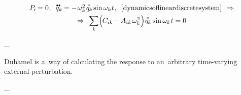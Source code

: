 \nopagebreak\vspace{-0.1em}\begin{equation}
\begin{array}{c}
P_{\hspace{-0.1ex}i} \hspace{-0.15ex} = 0
\hspace{.1ex} ,
\:\;
\mathdotdotabove{q}_k \hspace{-0.12ex} = - \hspace{.2ex} \omega_k^2 \hspace{.25ex} \mathasteriskabove{q}_{\hspace{-0.1ex}k} \hspace{-0.1ex} \operatorname{sin} \omega_k \hspace{.1ex} t
\hspace{.1ex} ,
\:\;
\eqref{dynamicsoflineardiscretesystem}
\:\: \Rightarrow
\\[.3em]
%
\Rightarrow \:\,
\scalebox{0.95}[1]{$\displaystyle \sum_{\smash{k}}$} \Bigl( \hspace{-0.2ex} C_{ik} \hspace{-0.1ex} - \hspace{-0.2ex} A_{ik} \hspace{.25ex} \omega_k^2 \hspace{.1ex} \Bigr) \hspace{.12ex}
\mathasteriskabove{q}_{\hspace{-0.1ex}k} \operatorname{sin} \omega_k \hspace{.1ex} t
= 0
\end{array}
\end{equation}

...


 Duhamel
is a~way of calculating the response
to an~arbitrary
time-varying
external
perturbation.

...

\section*{\small \wordforbibliography}

